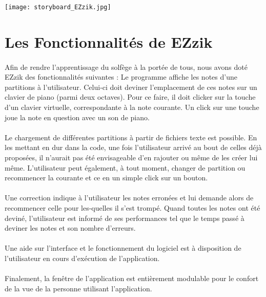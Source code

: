 \documentclass[a4paper, 12pt]{article}
\begin{document}
    \begin{landscape}
    \begin{center}
    \texttt{[image: storyboard\_EZzik.jpg]}
    \end{center}
    \end{landscape}

\section{Les Fonctionnalités de EZzik}
    \paragraph{}
    Afin de rendre l'apprentissage du solfège à la portée de tous, nous avons doté EZzik des fonctionnalités suivantes : Le programme affiche les notes d'une partitions à l'utilisateur. Celui-ci doit deviner l'emplacement de ces notes sur un clavier de piano (parmi deux octaves). Pour ce faire, il doit clicker sur la touche d'un clavier virtuelle, correspondante à la note courante. Un click sur une touche joue la note en question avec un son de piano.
    \paragraph{}
    Le chargement de différentes partitions à partir de fichiers texte est possible. En les mettant en dur dans la code, une fois l'utilisateur arrivé au bout de celles déjà proposées, il n'aurait pas été envisageable d'en rajouter ou même de les créer lui même. L'utilisateur peut également, à tout moment, changer de partition ou recommencer la courante et ce en un simple click sur un bouton.
    \paragraph{}
    Une correction indique à l'utilisateur les notes erronées et lui demande alors de recommencer celle pour les-quelles il s'est trompé. Quand toutes les notes ont été deviné, l'utilisateur est informé de ses performances tel que le temps passé à deviner les notes et son nombre d'erreurs.
    \paragraph{}
    Une aide sur l'interface et le fonctionnement du logiciel est à disposition de l'utilisateur en cours d'exécution de l'application.
    \paragraph{}
    Finalement, la fenêtre de l'application est entièrement modulable pour le confort de la vue de la personne utilisant l'application.
\end{document}
